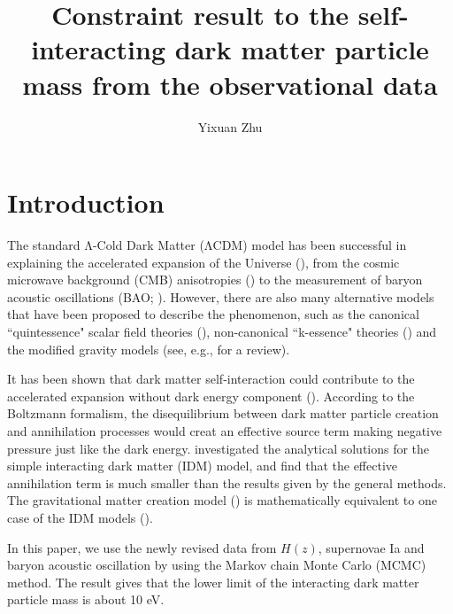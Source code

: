 \documentclass[twocolumn]{aastex631}
\begin{document}
 

   \title{Constraint result to the self-interacting dark matter particle mass from the
   observational data}

   \author{Yixuan Zhu}
 
   \begin{abstract}

   \end{abstract}
   
   \keywords{}

\section{Introduction}

   The standard Λ-Cold Dark Matter (ΛCDM) model has been successful in 
   explaining the accelerated expansion of the Universe (\cite{Riess_1998,Perlmutter_1999}), 
   from the cosmic microwave background (CMB) anisotropies (\cite{Bennett_1996}) to 
   the measurement of baryon acoustic oscillations (BAO; \cite{Eisenstein_2005}). 
   However, there are also many alternative models that have been proposed to describe 
   the phenomenon, such as the canonical ``quintessence" scalar field theories 
   (\cite{PhysRevD.37.3406, WETTERICH1988668,PhysRevLett.80.1582}),
   non-canonical ``k-essence" theories (\cite{PhysRevLett.85.4438, PhysRevD.63.103510})
   and the modified gravity models (see, e.g., \cite{CLIFTON20121} for a review).

   It has been shown that dark matter self-interaction could contribute 
   to the accelerated expansion without dark energy component (\cite{PhysRevD.64.063501, Balakin_2003}). 
   According to the Boltzmann formalism, the disequilibrium between dark matter particle
   creation and annihilation processes would creat an effective source term 
   making negative pressure just like the dark energy. \cite{Basilakos_2009}
   investigated the analytical solutions for the simple interacting dark matter (IDM) 
   model, and find that the effective annihilation term is much smaller than the
   results given by the general methods. The gravitational matter creation model (\cite{Lima_2008})
   is mathematically equivalent to one case of the IDM models (\cite{Basilakos_2009}).

   In this paper, we use the newly revised data from $H(z)$, supernovae Ia 
   and baryon acoustic oscillation by using the Markov chain Monte
   Carlo (MCMC) method. The result gives that the lower limit of the interacting
   dark matter particle mass is about 10 eV.
\end{document}
